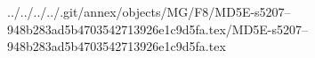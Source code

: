 ../../../../.git/annex/objects/MG/F8/MD5E-s5207--948b283ad5b4703542713926e1c9d5fa.tex/MD5E-s5207--948b283ad5b4703542713926e1c9d5fa.tex